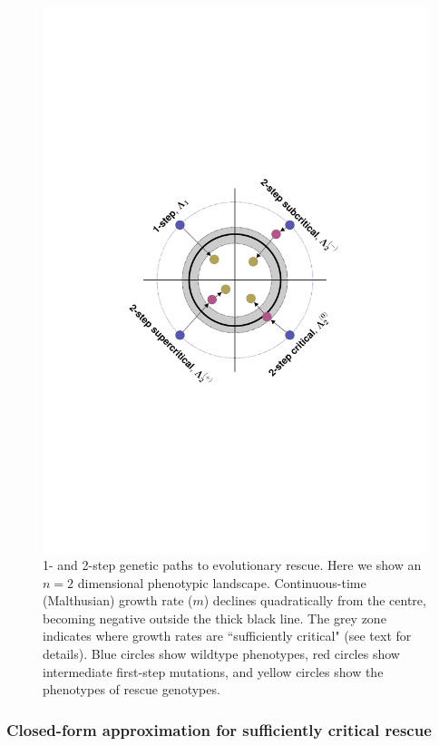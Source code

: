 \documentclass[9pt,twocolumn,twoside,lineno]{gsajnl}
\begin{document}
\begin{figure}[htb]
\centering
\includegraphics[width=\linewidth, trim = {14cm, 35cm, 14cm, 35cm}, clip]{../IMAGES/fgmer_diagrams_code.pdf}
\caption{
1- and 2-step genetic paths to evolutionary rescue.
Here we show an $n=2$ dimensional phenotypic landscape.
Continuous-time (Malthusian) growth rate ($m$) declines quadratically from the centre, becoming negative outside the thick black line.
The grey zone indicates where growth rates are ``sufficiently critical" (see text for details).
Blue circles show wildtype phenotypes, red circles show intermediate first-step mutations, and yellow circles show the phenotypes of rescue genotypes.
}%
\label{fig:paths}
\end{figure}

\subsubsection{Closed-form approximation for sufficiently critical rescue}
\end{document}
